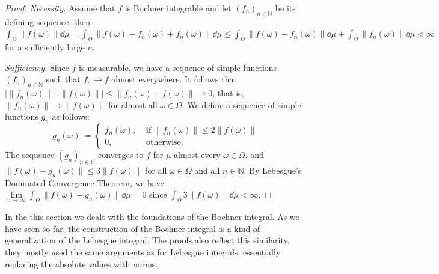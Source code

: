 \documentclass[a4paper, 12pt]{article}
\begin{document}
\begin{proof}
\emph{Necessity.} Assume that $f$ is Bochner integrable and let $(f_n)_{n \in \mathbb{N}}$ be its defining sequence, then $\int_{\Omega} \| f(\omega) \| \dd{\mu}  = \int_{\Omega} \| f(\omega) - f_n(\omega) + f_n(\omega) \| \dd{\mu} \leqslant \int_{\Omega} \| f(\omega) - f_n(\omega) \| \dd{\mu} + \int_{\Omega} \| f_n(\omega) \| \dd{\mu} < \infty$ for a sufficiently large $n$.

\emph{Sufficiency.} Since $f$ is measurable, we have a sequence of simple functions $(f_n)_{n \in \mathbb{N}}$ such that $f_n \rightarrow f$ almost everywhere. It follows that $|\|f_n(\omega)\| - \| f(\omega) \| | \leqslant \| f_n(\omega)  - f(\omega) \| \rightarrow 0$, that is, $\| f_n(\omega) \| \rightarrow \| f(\omega) \|$ for almost all $\omega \in \Omega$. We define a sequence of simple functions $g_n$ as follows: 
$$
g_n(\omega) := \left\{
    \begin{array}{ll}
      f_n(\omega), &\text{ if } \| f_n(\omega) \| \leqslant 2 \| f(\omega) \| \\
      0, &\text{ otherwise}.
    \end{array}
\right.
$$
The sequence $(g_n)_{n \in \mathbb{N}}$ converges to $f$ for $\mu$-almost every $\omega \in \Omega$, and $\| f(\omega) - g_n(\omega) \| \leqslant 3 \| f(\omega) \|$ for all $\omega \in \Omega$ and all $n \in \mathbb{N}$. By Lebesgue's Dominated Convergence Theorem, we have $\lim\limits_{n \to \infty} \int_{\Omega} \| f(\omega) - g_n(\omega) \| \dd{\mu} = 0$ since $\int_{\Omega} 3\| f(\omega) \| \dd{\mu} < \infty$.
\end{proof}
In the this section we dealt with the foundations of the Bochner integral. As we have seen so far, the construction of the Bochner integral is a kind of generalization of the Lebesgue integral. The proofs also reflect this similarity, they mostly used the same arguments as for Lebesgue integrals, essentially replacing the absolute values with norms.
\end{document}
